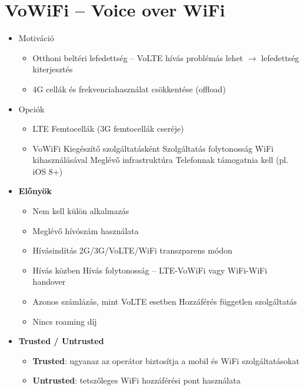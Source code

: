 \documentclass[10pt,a4paper]{article}
\begin{document}
\section{VoWiFi – Voice over WiFi}
	\begin{itemize}
		\item Motiváció
		\begin{itemize}
			\item Otthoni beltéri lefedettség – VoLTE hívás problémás
		lehet $\rightarrow$ lefedettség kiterjesztés
		\item 4G cellák és frekvenciahasználat csökkentése
		(offload)
		\end{itemize}
		\item  Opciók
		\begin{itemize}
			\item LTE Femtocellák (3G femtocellák cseréje)
		\item VoWiFi
		\subitem  Kiegészítő szolgáltatásként
		\subitem Szolgáltatás folytonosság WiFi kihasználásával
		\subsubitem Meglévő infrastruktúra
		\subsubitem Telefonnak támogatnia kell (pl. iOS 8+)
		\end{itemize}
	
	\item  \textbf{Előnyök}
		\begin{itemize}
		\item  Nem kell külön alkalmazás
		\item  Meglévő hívószám használata
		\item  Hívásindítás
		 \subitem 2G/3G/VoLTE/WiFi transzparens módon
		\item  Hívás közben
		 \subitem Hívás folytonosság – LTE-VoWiFi vagy WiFi-WiFi handover
		\item  Azonos számlázás, mint VoLTE esetben
		 \subitem Hozzáférés független szolgáltatás
		\item  Nincs roaming díj
		\end{itemize}
	\item \textbf{ Trusted / Untrusted}
		\begin{itemize}
		\item  \textbf{Trusted}: ugyanaz az operátor biztosítja a mobil és WiFi
		szolgáltatásokat
		\item  \textbf{Untrusted}: tetszőleges WiFi hozzáférési pont használata
		\end{itemize}
	\end{itemize}
\end{document}
